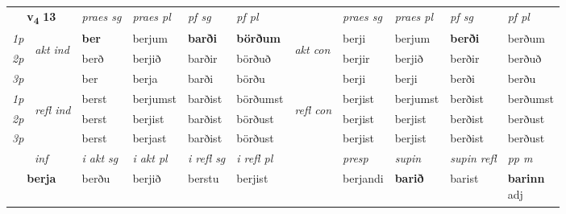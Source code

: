 \noindent
\begin{tabular}{lllllllllll} \toprule
\multicolumn{2}{c}{\textbf{v{\textsubscript{4}}} \Large{\textbf{13}}}  &  \textit{praes sg}  & \textit{praes pl}  &\textit{ pf sg} & \textit{pf pl} &  &  \textit{praes sg}  & \textit{praes pl}  & \textit{pf sg} & \textit{pf pl } \\*
	\cmidrule{3-6} \cmidrule{8-11}
 {\textit{1p}} & \multirow{3}{*}{\begin{turn}{90}\textit{akt ind}\end{turn}} & \textbf{ber} & berjum & \textbf{barði} & \textbf{börðum} & \multirow{3}{*}{\begin{turn}{90}\textit{akt con}\end{turn}} &berji & berjum & \textbf{berði} & berðum\\*
 {\textit{2p}} &  &  berð  & berjið & barðir & börðuð & & berjir & berjið & berðir & berðuð \\*
{\textit{3p}} &  & ber & berja & barði & börðu & & berji & berji& berði & berðu \\*
\cmidrule{3-6} \cmidrule{8-11}
 {\textit{1p}} & \multirow{3}{*}{\begin{turn}{90}\textit{refl ind}\end{turn}}  & berst & berjumst & barðist & börðumst & \multirow{3}{*}{\begin{turn}{90}\textit{refl con}\end{turn}}  &berjist & berjumst & berðist & berðumst \\*
 {\textit{2p}} &  & berst & berjist & barðist & börðust & &berjist & berjist & berðist & berðust \\*
 {\textit{3p}}  & & berst & berjast & barðist & börðust & & berjist & berjist& berðist & berðust \\*
\cmidrule{3-6} \cmidrule{8-11}

   \multicolumn{2}{c}{\textit{inf}}  & \textit{i akt sg} & \textit{i akt pl} & \textit{i refl sg} & \textit{i refl pl} && \textit{presp} & \textit{supin} & \textit{supin refl} & \textit{pp m} \\*
  \multicolumn{2}{c}{\textbf{berja}} & berðu  & berjið & berstu & berjist && berjandi &  \textbf{barið} & barist & \specialcell{\textbf{barinn} \\ adj\textbf{\textsubscript{}}} \\*
\end{tabular}

